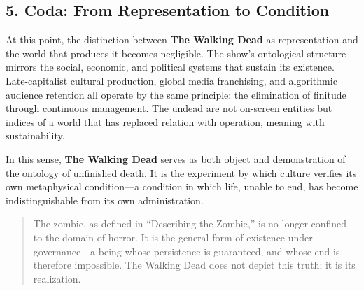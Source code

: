 \documentclass[11pt]{article}
\begin{document}
\subsection*{5. Coda: From Representation to Condition}
\label{sec:org1dcecce}

At this point, the distinction between \textbf{The Walking Dead} as representation and the world that produces it becomes negligible.  
The show’s ontological structure mirrors the social, economic, and political systems that sustain its existence.  
Late-capitalist cultural production, global media franchising, and algorithmic audience retention all operate by the same principle: the elimination of finitude through continuous management.  
The undead are not on-screen entities but indices of a world that has replaced relation with operation, meaning with sustainability.  

In this sense, \textbf{The Walking Dead} serves as both object and demonstration of the ontology of unfinished death.  
It is the experiment by which culture verifies its own metaphysical condition—a condition in which life, unable to end, has become indistinguishable from its own administration.  

\begin{quote}
The zombie, as defined in “Describing the Zombie,” is no longer confined to the domain of horror.  
It is the general form of existence under governance—a being whose persistence is guaranteed, and whose end is therefore impossible.  
The Walking Dead does not depict this truth; it is its realization.
\end{quote}
\end{document}
